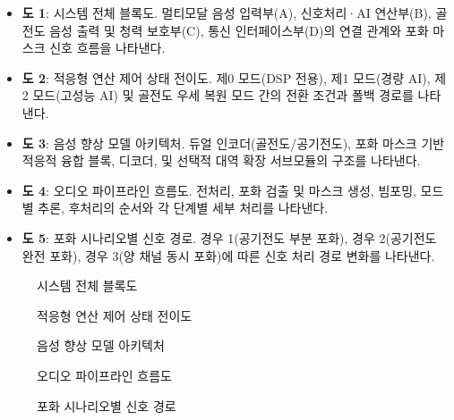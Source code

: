 \documentclass{article}
\begin{document}
\begin{itemize}
    \item \textbf{도 1}: 시스템 전체 블록도. 멀티모달 음성 입력부(A), 신호처리·AI 연산부(B), 골전도 음성 출력 및 청력 보호부(C), 통신 인터페이스부(D)의 연결 관계와 포화 마스크 신호 흐름을 나타낸다.
    \item \textbf{도 2}: 적응형 연산 제어 상태 전이도. 제0 모드(DSP 전용), 제1 모드(경량 AI), 제2 모드(고성능 AI) 및 골전도 우세 복원 모드 간의 전환 조건과 폴백 경로를 나타낸다.
    \item \textbf{도 3}: 음성 향상 모델 아키텍처. 듀얼 인코더(골전도/공기전도), 포화 마스크 기반 적응적 융합 블록, 디코더, 및 선택적 대역 확장 서브모듈의 구조를 나타낸다.
    \item \textbf{도 4}: 오디오 파이프라인 흐름도. 전처리, 포화 검출 및 마스크 생성, 빔포밍, 모드별 추론, 후처리의 순서와 각 단계별 세부 처리를 나타낸다.
    \item \textbf{도 5}: 포화 시나리오별 신호 경로. 경우 1(공기전도 부분 포화), 경우 2(공기전도 완전 포화), 경우 3(양 채널 동시 포화)에 따른 신호 처리 경로 변화를 나타낸다.
\end{itemize}

\begin{figure}[H]
    \centering
    \resizebox{\textwidth}{!}{%
    }
    \caption{시스템 전체 블록도}
    \label{fig:system-block}
\end{figure}

\begin{figure}[H]
    \centering
    \resizebox{0.97\textwidth}{!}{%
    }
    \caption{적응형 연산 제어 상태 전이도}
    \label{fig:state-transition}
\end{figure}

\begin{figure}[H]
    \centering
    \resizebox{0.97\textwidth}{!}{%
    }
    \caption{음성 향상 모델 아키텍처}
    \label{fig:model-architecture}
\end{figure}

\begin{figure}[H]
    \centering
    \resizebox{0.97\textwidth}{!}{%
    }
    \caption{오디오 파이프라인 흐름도}
    \label{fig:audio-pipeline}
\end{figure}

\begin{figure}[H]
    \centering
    \resizebox{0.97\textwidth}{!}{%
    }
    \caption{포화 시나리오별 신호 경로}
    \label{fig:saturation-scenarios}
\end{figure}
\end{document}
